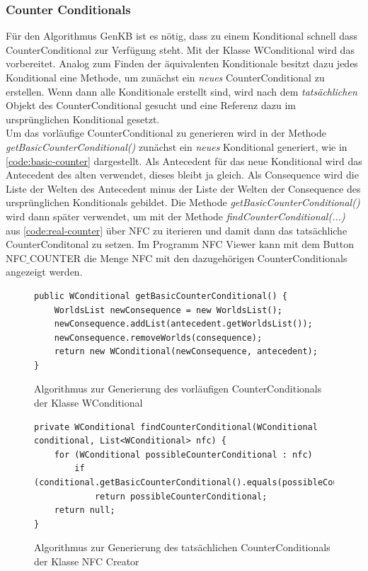 \documentclass[12pt,a4paper]{article}
\begin{document}
\subsubsection{Counter Conditionals}
\label{sec:counter-conditonals}
Für den Algorithmus GenKB ist es nötig, dass zu einem Konditional schnell dass CounterConditional zur Verfügung steht. Mit der Klasse WConditional wird das vorbereitet. Analog zum Finden der äquivalenten Konditionale besitzt dazu jedes Konditional eine Methode, um zunächst ein \textit{neues} CounterConditional zu erstellen. Wenn dann alle Konditionale erstellt sind, wird nach dem \textit{tatsächlichen} Objekt des CounterConditional gesucht und eine Referenz dazu im ursprünglichen Konditional gesetzt. \\
Um das vorläufige CounterConditional zu generieren wird in der Methode \textit{getBasicCounterConditional()} zunächst ein \textit{neues} Konditional generiert, wie in \autoref{code:basic-counter} dargestellt. Als Antecedent für das neue Konditional wird das Antecedent des alten verwendet, dieses bleibt ja gleich. Als Consequence wird die Liste der Welten des Antecedent minus der Liste der Welten der Consequence des ursprünglichen Konditionals gebildet. Die Methode \textit{getBasicCounterConditional()} wird dann später verwendet, um mit der Methode \textit{findCounterConditional(...)} aus \autoref{code:real-counter} über NFC zu iterieren und damit dann das tatsächliche CounterConditonal zu setzen. Im Programm NFC Viewer kann mit dem Button NFC$\_$COUNTER die Menge NFC mit den dazugehörigen CounterConditionals angezeigt werden.



\begin{figure}
\begin{lstlisting}
public WConditional getBasicCounterConditional() {
    WorldsList newConsequence = new WorldsList();
    newConsequence.addList(antecedent.getWorldsList());
    newConsequence.removeWorlds(consequence);
    return new WConditional(newConsequence, antecedent);
}
\end{lstlisting}
\caption{Algorithmus zur Generierung des vorläufigen CounterConditionals der Klasse WConditional}
\label{code:basic-counter}
\end{figure} 


\begin{figure}
\begin{lstlisting}
private WConditional findCounterConditional(WConditional conditional, List<WConditional> nfc) {
    for (WConditional possibleCounterConditional : nfc)
        if (conditional.getBasicCounterConditional().equals(possibleCounterConditional))
            return possibleCounterConditional;
    return null;
}
\end{lstlisting}
\caption{Algorithmus zur Generierung des tatsächlichen CounterConditionals der Klasse NFC Creator}
\label{code:real-counter}
\end{figure} 
\end{document}
